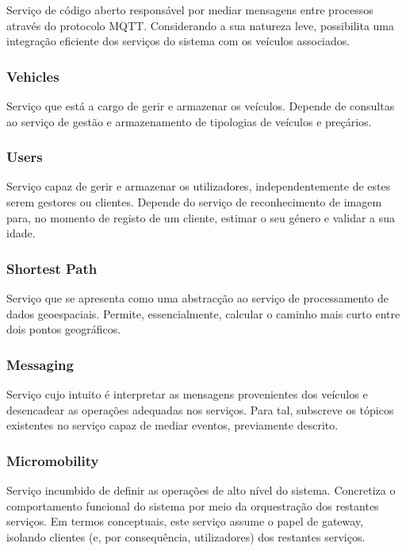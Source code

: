 Serviço de código aberto responsável por mediar mensagens entre processos através do protocolo MQTT. Considerando a sua natureza leve, possibilita uma integração eficiente dos serviços do sistema com os veículos associados.

\subsubsection{Vehicles}

Serviço que está a cargo de gerir e armazenar os veículos. Depende de consultas ao serviço de gestão e armazenamento de tipologias de veículos e preçários.

\subsubsection{Users}

Serviço capaz de gerir e armazenar os utilizadores, independentemente de estes serem gestores ou clientes. Depende do serviço de reconhecimento de imagem para, no momento de registo de um cliente, estimar o seu género e validar a sua idade.

\subsubsection{Shortest Path}

Serviço que se apresenta como uma abstracção ao serviço de processamento de dados geoespaciais. Permite, essencialmente, calcular o caminho mais curto entre dois pontos geográficos.

\subsubsection{Messaging}

Serviço cujo intuito é interpretar as mensagens provenientes dos veículos e desencadear as operações adequadas nos serviços. Para tal, subscreve os  tópicos existentes no serviço capaz de mediar eventos, previamente descrito.

\subsubsection{Micromobility}

Serviço incumbido de definir as operações de alto nível do sistema. Concretiza o comportamento funcional do sistema por meio da orquestração dos restantes serviços. Em termos conceptuais, este serviço assume o papel de gateway, isolando clientes (e, por consequência, utilizadores) dos restantes serviços.

